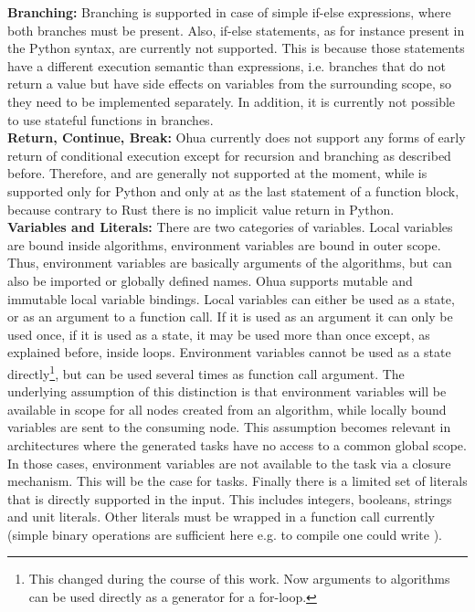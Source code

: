\textbf{Branching:} Branching is supported in case of simple if-else expressions, where both branches must be present. Also, if-else statements, as for instance present in the Python syntax, are currently not supported. This is because those statements have a different execution semantic than expressions, i.e. branches that do not return a value but have side effects on variables from the surrounding scope, so they need to be implemented separately. In addition, it is currently not possible to use stateful functions in branches.\\

\textbf{Return, Continue, Break:} Ohua currently does not support any forms of early return of conditional execution except for recursion and branching as described before. Therefore,  and  are generally not supported at the moment, while  is supported only for Python and only at as the last statement of a function block, because contrary to Rust there is no implicit value return in Python. \\

\textbf{Variables and Literals:} There are two categories of variables. Local variables are bound inside algorithms, environment variables are bound in outer scope. Thus, environment variables are basically arguments of the algorithms, but can also be imported or globally defined names. Ohua supports mutable and immutable local variable bindings. Local variables can either be used as a state, or as an argument to a function call. If it is used as an argument it can only be used once, if it is used as a state, it may be used more than once except, as explained before, inside loops. Environment variables cannot be used as a state directly\footnote{This changed during the course of this work. Now arguments to algorithms can be used directly as a generator for a for-loop.}, but can be used several times as function call argument. The underlying assumption of this distinction is that environment variables will be available in scope for all nodes created from an algorithm, while locally bound variables are sent to the consuming node. This assumption becomes relevant in architectures where the generated tasks have no access to a common global scope. In those cases, environment variables are not available to the task via a closure mechanism. This will be the case for \md tasks. Finally there is a limited set of literals that is directly supported in the input. This includes integers, booleans, strings and unit literals. Other literals must be wrapped in a function call currently (simple binary operations are sufficient here e.g. to compile  one could write ).\\

